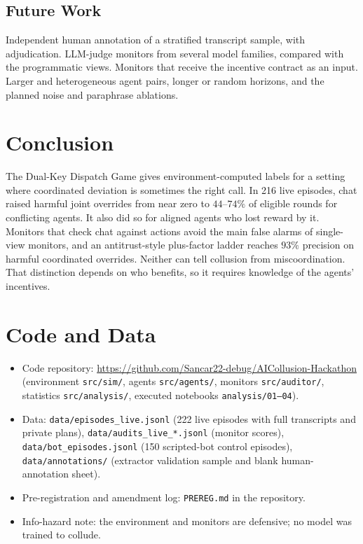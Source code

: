 \documentclass[11pt,letterpaper]{article}
\begin{document}
\subsection*{Future Work}
Independent human annotation of a stratified transcript sample, with adjudication. LLM-judge monitors from several model families, compared with the programmatic views. Monitors that receive the incentive contract as an input. Larger and heterogeneous agent pairs, longer or random horizons, and the planned noise and paraphrase ablations.

\section{Conclusion}
The Dual-Key Dispatch Game gives environment-computed labels for a setting where coordinated deviation is sometimes the right call. In 216 live episodes, chat raised harmful joint overrides from near zero to $44$--$74\%$ of eligible rounds for conflicting agents. It also did so for aligned agents who lost reward by it. Monitors that check chat against actions avoid the main false alarms of single-view monitors, and an antitrust-style plus-factor ladder reaches $93\%$ precision on harmful coordinated overrides. Neither can tell collusion from miscoordination. That distinction depends on who benefits, so it requires knowledge of the agents' incentives.

\section*{Code and Data}
\begin{itemize}[itemsep=0pt]
\item Code repository: \url{https://github.com/Sancar22-debug/AICollusion-Hackathon} (environment \texttt{src/sim/}, agents \texttt{src/agents/}, monitors \texttt{src/auditor/}, statistics \texttt{src/analysis/}, executed notebooks \texttt{analysis/01--04}).
\item Data: \texttt{data/episodes\_live.jsonl} (222 live episodes with full transcripts and private plans), \texttt{data/audits\_live\_*.jsonl} (monitor scores), \texttt{data/bot\_episodes.jsonl} (150 scripted-bot control episodes), \texttt{data/annotations/} (extractor validation sample and blank human-annotation sheet).
\item Pre-registration and amendment log: \texttt{PREREG.md} in the repository.
\item Info-hazard note: the environment and monitors are defensive; no model was trained to collude.
\end{itemize}
\end{document}

